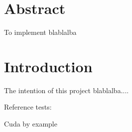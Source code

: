 
\section{Abstract}
To implement blablalba

\section{Introduction}
The intention of this project blablalba....

Reference tests:

Cuda by example\cite{cudabyexample}

\newpage
\tableofcontents
\newpage



\newpage


\newpage


\newpage


\newpage


\newpage


\newpage


\newpage







